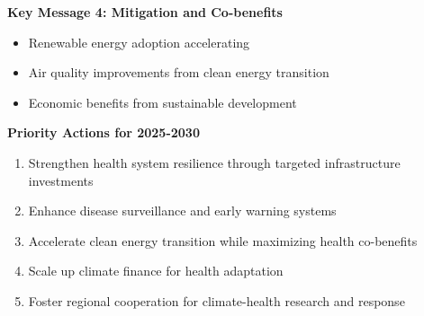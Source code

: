\begin{keymessage}
    \textbf{Key Message 4: Mitigation and Co-benefits}
    \begin{itemize}
        \item Renewable energy adoption accelerating
        \item Air quality improvements from clean energy transition
        \item Economic benefits from sustainable development
    \end{itemize}
\end{keymessage}

\begin{recommendation}
    \textbf{Priority Actions for 2025-2030}
    \begin{enumerate}
        \item Strengthen health system resilience through targeted infrastructure investments
        \item Enhance disease surveillance and early warning systems
        \item Accelerate clean energy transition while maximizing health co-benefits
        \item Scale up climate finance for health adaptation
        \item Foster regional cooperation for climate-health research and response
    \end{enumerate}
\end{recommendation}
